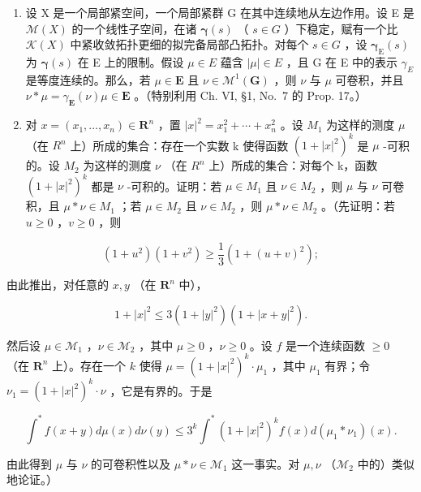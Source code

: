 \begin{enumerate}
\def\labelenumi{\arabic{enumi})}
\setcounter{enumi}{1}
\item
  设 X 是一个局部紧空间，一个局部紧群 G 在其中连续地从左边作用。设 E 是 \(\mathcal{M}(X)\) 的一个线性子空间，在诸 \(\boldsymbol{\gamma}(s)\) （ \(s \in G\) ）下稳定，赋有一个比 \(\mathcal{K}(X)\) 中紧收敛拓扑更细的拟完备局部凸拓扑。对每个 \(s \in G\) ，设 \(\boldsymbol{\gamma}_{\mathrm{E}}(s)\) 为 \(\boldsymbol{\gamma}(s)\) 在 E 上的限制。假设 \(\mu \in E\) 蕴含 \(|\mu| \in E\) ，且 G 在 E 中的表示 \(\gamma_{E}\) 是等度连续的。那么，若 \(\mu \in \mathbf{E}\) 且 \(\nu \in \mathcal{M}^1 (\mathbf{G})\) ，则 \(\nu\) 与 \(\mu\) 可卷积，并且 \(\nu * \mu = \gamma_{\mathbf{E}}(\nu)\mu \in \mathbf{E}\) 。（特别利用 Ch. VI, §1, No.~7 的 Prop. 17。）
\item
  对 \(x = (x_{1}, \ldots, x_{n}) \in \mathbf{R}^{n}\) ，置 \(|x|^{2} = x_{1}^{2} + \cdots + x_{n}^{2}\) 。设 \(M_{1}\) 为这样的测度 \(\mu\) （在 \(R^{n}\) 上）所成的集合：存在一个实数 k 使得函数 \((1 + |x|^{2})^{k}\) 是 \(\mu\) -可积的。设 \(M_{2}\) 为这样的测度 \(\nu\) （在 \(R^{n}\) 上）所成的集合：对每个 k，函数 \((1 + |x|^{2})^{k}\) 都是 \(\nu\) -可积的。证明：若 \(\mu \in M_{1}\) 且 \(\nu \in M_{2}\) ，则 \(\mu\) 与 \(\nu\) 可卷积，且 \(\mu * \nu \in M_{1}\) ；若 \(\mu \in M_{2}\) 且 \(\nu \in M_{2}\) ，则 \(\mu * \nu \in M_{2}\) 。（先证明：若 \(u \geqslant 0\) ，\(v \geqslant 0\) ，则
\end{enumerate}

\[
(1 + u ^ {2}) (1 + v ^ {2}) \geqslant \frac {1}{3} (1 + (u + v) ^ {2});
\]

由此推出，对任意的 \(x, y\) （在 \(\mathbf{R}^n\) 中），

\[
1 + | x | ^ {2} \leqslant 3 (1 + | y | ^ {2}) (1 + | x + y | ^ {2}).
\]

然后设 \(\mu \in \mathcal{M}_1\) ，\(\nu \in \mathcal{M}_2\) ，其中 \(\mu \geqslant 0\) ，\(\nu \geqslant 0\) 。设 \(f\) 是一个连续函数 \(\geqslant 0\) （在 \(\mathbf{R}^n\) 上）。存在一个 \(k\) 使得 \(\mu = (1 + |x|^2)^k \cdot \mu_1\) ，其中 \(\mu_1\) 有界；令 \(\nu_1 = (1 + |x|^2)^k \cdot \nu\) ，它是有界的。于是

\[
\int^ {*} f (x + y) d \mu (x) d \nu (y) \leqslant 3 ^ {k} \int^ {*} (1 + | x | ^ {2}) ^ {k} f (x) d (\mu_ {1} * \nu_ {1}) (x).
\]

由此得到 \(\mu\) 与 \(\nu\) 的可卷积性以及 \(\mu * \nu \in \mathcal{M}_1\) 这一事实。对 \(\mu, \nu\) （\(\mathcal{M}_2\) 中的）类似地论证。）

